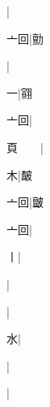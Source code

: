 \begin{multicols}{2}
{{}|{}\par
{\cjk{}{\cnsym{}　}亠回}|{\cjk{}勯}\par
{}|{}\par
{一}|{\cjk{}翧}\par
{\cjk{}{\cnsym{}　}亠回}|{}\par
{\cjk{}頁{\cnsym{}　}{\cnsym{}　}}|{}\par
{\cjk{}{\cnsym{}　}{\cnsym{}　}木}|{\cjk{}皶}\par
{\cjk{}{\cnsym{}　}亠回}|{\cjk{}皽}\par
{\cjk{}{\cnsym{}　}亠回}|{}\par
{丨}|{}\par
{}|{}\par
{\cjk{}{\cnsym{}　}{\cnsym{}　}{\cnsym{}　}}|{}\par
{\cjk{}{\cnsym{}　}{\cnsym{}　}水}|{}\par
{\cjk{}{\cnsym{}　}{\cnsym{}　}{\cnsym{}　}}|{}\par
{\cjk{}{\cnsym{}　}{\cnsym{}　}{\cnsym{}　}}|{}\par
}
\end{multicols}
